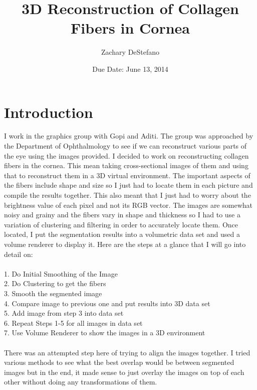 \documentclass[11pt,psfig]{article}
\begin{document}
\setlength{\parskip}{1.2ex plus0.3ex minus 0.3ex}


\thispagestyle{empty} \pagestyle{myheadings} 



\title{3D Reconstruction of Collagen Fibers in Cornea}
\author{Zachary DeStefano}
\date{Due Date: June 13, 2014}

\maketitle

\vfill\eject

\newpage

\section{Introduction}

I work in the graphics group with Gopi and Aditi. The group was approached by the Department of Ophthalmology to see if we can reconstruct various parts of the eye using the images provided. I decided to work on reconstructing collagen fibers in the cornea. This mean taking cross-sectional images of them and using that to reconstruct them in a 3D virtual environment. The important aspects of the fibers include shape and size so I just had to locate them in each picture and compile the results together. This also meant that I just had to worry about the brightness value of each pixel and not its RGB vector. The images are somewhat noisy and grainy and the fibers vary in shape and thickness so I had to use a variation of clustering and filtering in order to accurately locate them. Once located, I put the segmentation results into a volumetric data set and used a volume renderer to display it. Here are the steps at a glance that I will go into detail on: \\
\\
1. Do Initial Smoothing of the Image \\
2. Do Clustering to get the fibers\\
3. Smooth the segmented image\\
4. Compare image to previous one and put results into 3D data set\\
5. Add image from step 3 into data set\\
6. Repeat Steps 1-5 for all images in data set\\
7. Use Volume Renderer to show the images in a 3D environment\\
\\
There was an attempted step here of trying to align the images together. I tried various methods to see what the best overlap would be between segmented images but in the end, it made sense to just overlay the images on top of each other without doing any transformations of them. 
\end{document}
